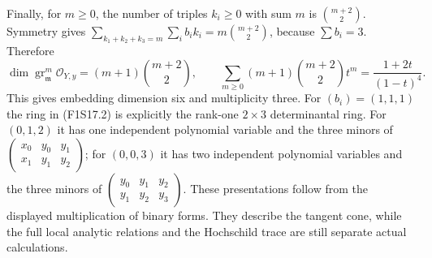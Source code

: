 Finally, for $m\geq0$, the number of triples $k_i\geq0$ with sum $m$
is $\binom{m+2}{2}$. Symmetry gives
$\sum_{k_1+k_2+k_3=m}\sum_i b_ik_i
  =m\binom{m+2}{2}$, because $\sum b_i=3$. Therefore
\[
 \dim\operatorname{gr}_{\mathfrak m}^m\mathcal O_{Y,y}
          =(m+1)\binom{m+2}{2},\qquad
 \sum_{m\geq0}(m+1)\binom{m+2}{2}t^m
                         =\frac{1+2t}{(1-t)^4}.
 \tag{F1S17.7}
\]
This gives embedding dimension six and multiplicity three. For
$(b_i)=(1,1,1)$ the ring in (F1S17.2) is explicitly the rank-one
$2\times3$ determinantal ring. For $(0,1,2)$ it has one independent
polynomial variable and the three minors of
$\left(\begin{smallmatrix}x_0&y_0&y_1\\x_1&y_1&y_2\end{smallmatrix}\right)$;
for $(0,0,3)$ it has two independent polynomial variables and the three
minors of
$\left(\begin{smallmatrix}y_0&y_1&y_2\\y_1&y_2&y_3\end{smallmatrix}\right)$.
These presentations follow from the displayed multiplication of binary
forms. They describe the tangent cone, while the full local analytic
relations and the Hochschild trace are still separate actual
calculations.
